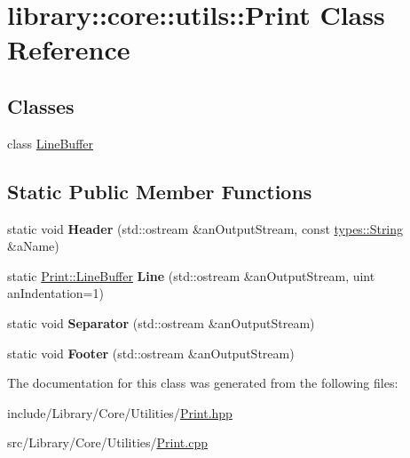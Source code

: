 \hypertarget{classlibrary_1_1core_1_1utils_1_1_print}{}\section{library\+:\+:core\+:\+:utils\+:\+:Print Class Reference}
\label{classlibrary_1_1core_1_1utils_1_1_print}
\subsection*{Classes}
\begin{DoxyCompactItemize}
\item 
class \hyperlink{classlibrary_1_1core_1_1utils_1_1_print_1_1_line_buffer}{Line\+Buffer}
\end{DoxyCompactItemize}
\subsection*{Static Public Member Functions}
\begin{DoxyCompactItemize}
\item 
\mbox{\label{classlibrary_1_1core_1_1utils_1_1_print_a828afa2d09d997e2ad5b5a93ab81bcb0}} 
static void {\bfseries Header} (std\+::ostream \&an\+Output\+Stream, const \hyperlink{classlibrary_1_1core_1_1types_1_1_string}{types\+::\+String} \&a\+Name)
\item 
\mbox{\label{classlibrary_1_1core_1_1utils_1_1_print_ab4d98c65fbb58213358df534dd1f6d65}} 
static \hyperlink{classlibrary_1_1core_1_1utils_1_1_print_1_1_line_buffer}{Print\+::\+Line\+Buffer} {\bfseries Line} (std\+::ostream \&an\+Output\+Stream, uint an\+Indentation=1)
\item 
\mbox{\label{classlibrary_1_1core_1_1utils_1_1_print_a58361390194e28388d3ac0ec0910cc0c}} 
static void {\bfseries Separator} (std\+::ostream \&an\+Output\+Stream)
\item 
\mbox{\label{classlibrary_1_1core_1_1utils_1_1_print_a5c9f1797eafda1b8e8ef95d5a2902df2}} 
static void {\bfseries Footer} (std\+::ostream \&an\+Output\+Stream)
\end{DoxyCompactItemize}


The documentation for this class was generated from the following files\+:\begin{DoxyCompactItemize}
\item 
include/\+Library/\+Core/\+Utilities/\hyperlink{_print_8hpp}{Print.\+hpp}\item 
src/\+Library/\+Core/\+Utilities/\hyperlink{_print_8cpp}{Print.\+cpp}\end{DoxyCompactItemize}
